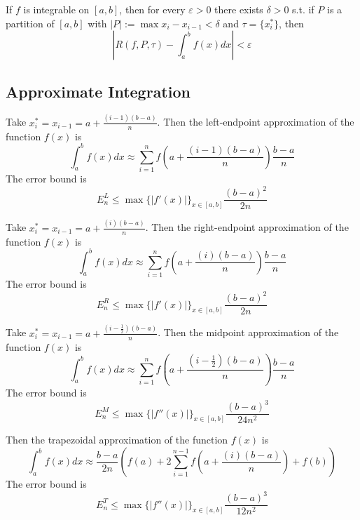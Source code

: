 \begin{theorem}
  If $f$ is integrable on $[a, b]$, then for every $\varepsilon > 0$ there exists $\delta > 0$ s.t. if $P$ is a partition of $[a, b]$ with $|P| := \max{x_i - x_{i-1}} < \delta$ and $\tau = \{x_i^*\}$, then 
  \[
    | R(f, P, \tau) - \int_a^b f(x) dx | < \varepsilon
  \] 
\end{theorem}

\subsection*{Approximate Integration}

\begin{definition}
  Take $x_i^* = x_{i-1} = a + \frac{(i-1)(b-a)}{n}$. Then the left-endpoint approximation of the function $f(x)$ is
  \[
    \int_a^b f(x) dx \approx \sum_{i=1}^n f(a + \frac{(i-1)(b-a)}{n}) \frac{b-a}{n}
  \]
  The error bound is
  \[
    E_n^L \leq \max\{|f'(x)|\}_{x \in [a, b]} \frac{(b-a)^2}{2n}
  \]
\end{definition}

\begin{definition}
  Take $x_i^* = x_{i-1} = a + \frac{(i)(b-a)}{n}$. Then the right-endpoint approximation of the function $f(x)$ is
  \[
    \int_a^b f(x) dx \approx \sum_{i=1}^n f(a + \frac{(i)(b-a)}{n}) \frac{b-a}{n}
  \]
  The error bound is
  \[
    E_n^R \leq \max\{|f'(x)|\}_{x \in [a, b]} \frac{(b-a)^2}{2n}
  \]
\end{definition}

\begin{definition}
  Take $x_i^* = x_{i-1} = a + \frac{(i-\frac{1}{2})(b-a)}{n}$. Then the midpoint approximation of the function $f(x)$ is
  \[
    \int_a^b f(x) dx \approx \sum_{i=1}^n f(a + \frac{(i-\frac{1}{2})(b-a)}{n}) \frac{b-a}{n}
  \]
  The error bound is
  \[
    E_n^M \leq \max\{|f''(x)|\}_{x \in [a, b]} \frac{(b-a)^3}{24n^2}
  \]
\end{definition}

\begin{definition}
  Then the trapezoidal approximation of the function $f(x)$ is
  \[
    \int_a^b f(x) dx \approx \frac{b-a}{2n} (f(a) + 2 \sum_{i=1}^{n-1} f(a + \frac{(i)(b-a)}{n}) + f(b))
  \]
  The error bound is
  \[
    E_n^T \leq \max\{|f''(x)|\}_{x \in [a, b]} \frac{(b-a)^3}{12n^2}
  \]
\end{definition}


